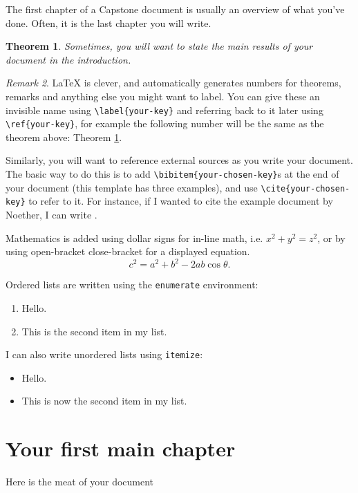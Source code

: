 \documentclass[12pt, a4paper,twoside]{report}
\theoremstyle{plain} %
\newtheorem{theorem}{Theorem}[chapter]
\theoremstyle{definition} %
\theoremstyle{remark} %
\newtheorem{remark}[theorem]{Remark}
\numberwithin{equation}{chapter}
\begin{document}
The first chapter of a Capstone document is usually an overview of what you've done. Often, it is the last chapter you will write.

\begin{theorem} \label{example-theorem}
Sometimes, you will want to state the main results of your document in the introduction.
\end{theorem}

\begin{remark}
LaTeX is clever, and automatically generates numbers for theorems, remarks and anything else you might want to label. You can give these an invisible name using \verb!\label{your-key}! and referring back to it later using \verb!\ref{your-key}!, for example the following number will be the same as the theorem above: Theorem \ref{example-theorem}.
\end{remark}

Similarly, you will want to reference external sources as you write your document. The basic way to do this is to add \verb!\bibitem{your-chosen-key}!s at the end of your document (this template has three examples), and use \verb!\cite{your-chosen-key}! to refer to it. For instance, if I wanted to cite the example document by Noether, I can write \cite{bookByTuring}.

Mathematics is added using dollar signs for in-line math, i.e. $x^2 + y^2 = z^2$, or by using open-bracket close-bracket for a displayed equation.
\[ c^2 = a^2 + b^2 - 2ab\cos \theta. \]

Ordered lists are written using the \verb!enumerate! environment:
\begin{enumerate}
    \item Hello.
    \item This is the second item in my list.
\end{enumerate}

I can also write unordered lists using \verb!itemize!:
\begin{itemize}
    \item Hello.
    \item This is now the second item in my list.
\end{itemize}

\chapter{Your first main chapter}\label{ch:2}

Here is the meat of your document
\end{document}
